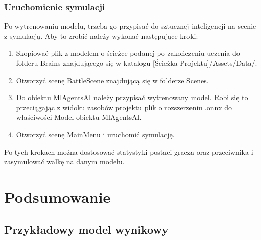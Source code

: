 \documentclass{SGGW-thesis}
\begin{document}
\subsection{Uruchomienie symulacji}
Po wytrenowaniu modelu, trzeba go przypisać do sztucznej inteligencji na scenie z symulacją. Aby to zrobić należy wykonać następujące kroki:
\begin{enumerate}
  \item{Skopiować plik z modelem o ścieżce podanej po zakończeniu uczenia do folderu Brains znajdującego się w katalogu [Ścieżka Projektu]/Assets/Data/}.
  \item{Otworzyć scenę BattleScene znajdującą się w folderze Scenes}.
  \item{Do obiektu MlAgentsAI należy przypisać wytrenowany model. Robi się to przeciągając z widoku zasobów projektu plik o rozszerzeniu .onnx do właściwości Model obiektu MlAgentsAI}.
  \item{Otworzyć scenę MainMenu i uruchomić symulację}.
\end{enumerate}
Po tych krokach można dostosować statystyki postaci gracza oraz przeciwnika i zasymulować walkę na danym modelu.


\chapter{Podsumowanie}
\section{Przykładowy model wynikowy}
\end{document}
